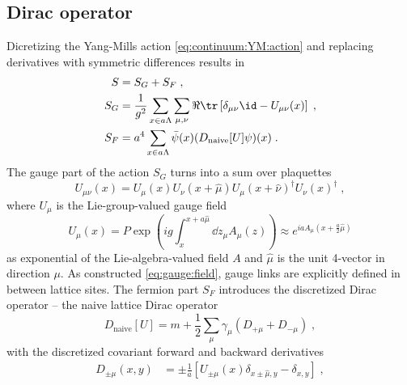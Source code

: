 \subsection{Dirac operator}

Dicretizing the Yang-Mills action \cref{eq:continuum:YM:action} and replacing derivatives with symmetric differences results in
\begin{align}
S &= S_G + S_F \;, \\
S_G &= \frac{1}{g^2} \sum_{x \in a \Lambda} \sum_{\mu, \nu} \Re \tr \left[ \delta_{\mu \nu} \id - U_{\mu \nu}(x) \right] \;, \\
S_F &= a^4 \sum_{x \in a \Lambda} \bar{\psi}(x) (D_{\text{naive}}[U] \psi)(x) \;.
\end{align}
The gauge part of the action $S_G$ turns into a sum over plaquettes
\begin{equation}
U_{\mu \nu}(x)
= U_{\mu}(x) U_{\nu}(x + \hat{\mu}) U_{\mu}(x + \hat{\nu})^{\dagger} U_{\nu}(x)^{\dagger} \;,
\end{equation}
where $U_{\mu}$ is the Lie-group-valued gauge field
\begin{equation} \label{eq:gauge:field}
U_{\mu}(x)
= P \exp(i g \int_x^{x + a \hat{\mu}} \dd z_{\mu} A_{\mu}(z) )
\approx e^{i a A_{\mu}(x + \frac{a}{2} \hat{\mu})}
\end{equation}
as exponential of the Lie-algebra-valued field $A$ and $\hat{\mu}$ is the unit 4-vector in direction $\mu$.
As constructed \cref{eq:gauge:field}, gauge links are explicitly defined in between lattice sites.
The fermion part $S_F$ introduces the discretized Dirac operator -- the naive lattice Dirac operator
\begin{equation}
D_{\text{naive}}[U] = m + \frac{1}{2} \sum_{\mu} \gamma_{\mu} \left( D_{+\mu} + D_{- \mu} \right) \;,
\end{equation}
with the discretized covariant forward and backward derivatives
\begin{align}
D_{\pm \mu}(x,y) &= \pm \frac{1}{a} \left[ U_{\pm \mu}(x) \delta_{x \pm \hat{\mu}, y} - \delta_{x,y} \right] \;,
\end{align}
